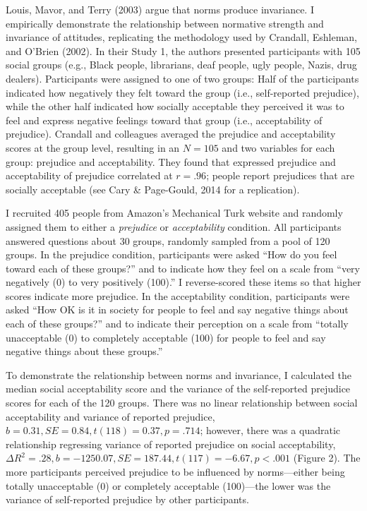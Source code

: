 \documentclass[english,man]{apa6}
\newcounter{author}
\theoremstyle{definition}
\theoremstyle{definition}
\theoremstyle{remark}
\begin{document}
Louis, Mavor, and Terry (2003) argue that norms produce invariance. I
empirically demonstrate the relationship between normative strength and
invariance of attitudes, replicating the methodology used by Crandall,
Eshleman, and O'Brien (2002). In their Study 1, the authors presented
participants with 105 social groups (e.g., Black people, librarians,
deaf people, ugly people, Nazis, drug dealers). Participants were
assigned to one of two groups: Half of the participants indicated how
negatively they felt toward the group (i.e., self-reported prejudice),
while the other half indicated how socially acceptable they perceived it
was to feel and express negative feelings toward that group (i.e.,
acceptability of prejudice). Crandall and colleagues averaged the
prejudice and acceptability scores at the group level, resulting in an
\(N = 105\) and two variables for each group: prejudice and
acceptability. They found that expressed prejudice and acceptability of
prejudice correlated at \(r = .96\); people report prejudices that are
socially acceptable (see Cary \& Page-Gould, 2014 for a replication).

I recruited 405 people from Amazon's Mechanical Turk website and
randomly assigned them to either a \emph{prejudice} or
\emph{acceptability} condition. All participants answered questions
about 30 groups, randomly sampled from a pool of 120 groups. In the
prejudice condition, participants were asked \enquote{How do you feel
toward each of these groups?} and to indicate how they feel on a scale
from \enquote{very negatively (0) to very positively (100).} I
reverse-scored these items so that higher scores indicate more
prejudice. In the acceptability condition, participants were asked
\enquote{How OK is it in society for people to feel and say negative
things about each of these groups?} and to indicate their perception on
a scale from \enquote{totally unacceptable (0) to completely acceptable
(100) for people to feel and say negative things about these groups.}

To demonstrate the relationship between norms and invariance, I
calculated the median social acceptability score and the variance of the
self-reported prejudice scores for each of the 120 groups. There was no
linear relationship between social acceptability and variance of
reported prejudice, \(b = 0.31, SE = 0.84, t(118) = 0.37, p = .714\);
however, there was a quadratic relationship regressing variance of
reported prejudice on social acceptability,
\(\Delta R^2 = .28, b = -1250.07, SE = 187.44, t(117) = -6.67, p < .001\)
(Figure 2). The more participants perceived prejudice to be influenced
by norms---either being totally unacceptable (0) or completely
acceptable (100)---the lower was the variance of self-reported prejudice
by other participants.
\end{document}

